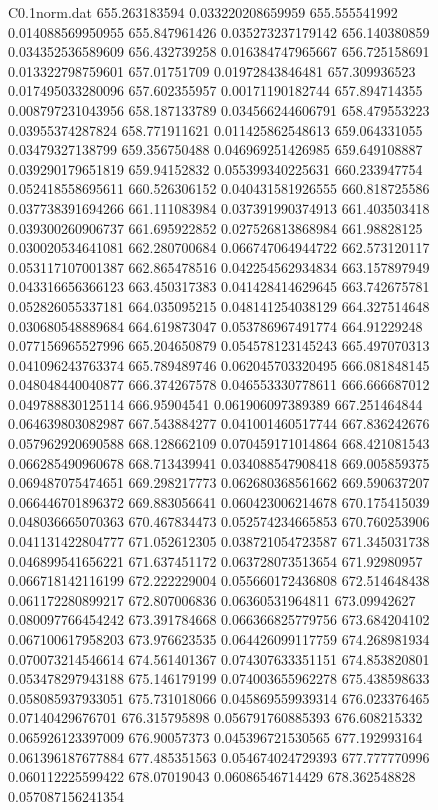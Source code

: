 \begin{filecontents}{C0.1norm.dat}
655.263183594		0.033220208659959
655.555541992		0.014088569950955
655.847961426		0.035273237179142
656.140380859		0.034352536589609
656.432739258		0.016384747965667
656.725158691		0.013322798759601
657.01751709		0.01972843846481
657.309936523		0.017495033280096
657.602355957		0.00171190182744
657.894714355		0.008797231043956
658.187133789		0.034566244606791
658.479553223		0.03955374287824
658.771911621		0.011425862548613
659.064331055		0.03479327138799
659.356750488		0.046969251426985
659.649108887		0.039290179651819
659.94152832		0.055399340225631
660.233947754		0.052418558695611
660.526306152		0.040431581926555
660.818725586		0.037738391694266
661.111083984		0.037391990374913
661.403503418		0.039300260906737
661.695922852		0.027526813868984
661.98828125		0.030020534641081
662.280700684		0.066747064944722
662.573120117		0.053117107001387
662.865478516		0.042254562934834
663.157897949		0.043316656366123
663.450317383		0.041428414629645
663.742675781		0.052826055337181
664.035095215		0.048141254038129
664.327514648		0.030680548889684
664.619873047		0.053786967491774
664.91229248		0.077156965527996
665.204650879		0.054578123145243
665.497070313		0.041096243763374
665.789489746		0.062045703320495
666.081848145		0.048048440040877
666.374267578		0.046553330778611
666.666687012		0.049788830125114
666.95904541		0.061906097389389
667.251464844		0.064639803082987
667.543884277		0.041001460517744
667.836242676		0.057962920690588
668.128662109		0.070459171014864
668.421081543		0.066285490960678
668.713439941		0.034088547908418
669.005859375		0.069487075474651
669.298217773		0.062680368561662
669.590637207		0.066446701896372
669.883056641		0.060423006214678
670.175415039		0.048036665070363
670.467834473		0.052574234665853
670.760253906		0.041131422804777
671.052612305		0.038721054723587
671.345031738		0.046899541656221
671.637451172		0.063728073513654
671.92980957		0.066718142116199
672.222229004		0.055660172436808
672.514648438		0.061172280899217
672.807006836		0.06360531964811
673.09942627		0.080097766454242
673.391784668		0.066366825779756
673.684204102		0.067100617958203
673.976623535		0.064426099117759
674.268981934		0.070073214546614
674.561401367		0.074307633351151
674.853820801		0.053478297943188
675.146179199		0.074003655962278
675.438598633		0.058085937933051
675.731018066		0.045869559939314
676.023376465		0.07140429676701
676.315795898		0.056791760885393
676.608215332		0.065926123397009
676.90057373		0.045396721530565
677.192993164		0.061396187677884
677.485351563		0.054674024729393
677.777770996		0.060112225599422
678.07019043		0.06086546714429
678.362548828		0.057087156241354

\end{filecontents}

